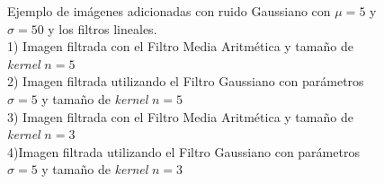 \begin{landscape}
\begin{figure}[!h]
\begin{tabular}{cc}
			\end{tabular}
			\label{Ruido_Gauss_Filtros_lineales}
			\caption{Ejemplo de imágenes adicionadas con ruido Gaussiano con $\mu = 5$ y $\sigma = 50$ y los filtros lineales. \\ 1) Imagen filtrada con el Filtro Media Aritmética y tamaño de \textit{kernel} $n = 5$ \\ 2) Imagen filtrada utilizando el Filtro Gaussiano con parámetros $\sigma = 5$ y tamaño de \textit{kernel} $n = 5$ \\ 3) Imagen filtrada con el Filtro Media Aritmética y tamaño de \textit{kernel} $n = 3$ \\ 4)Imagen filtrada utilizando el Filtro Gaussiano con parámetros $\sigma = 5$ y tamaño de \textit{kernel} $n = 3$}
		\end{figure}
		
		\newpage
		

\end{landscape}
